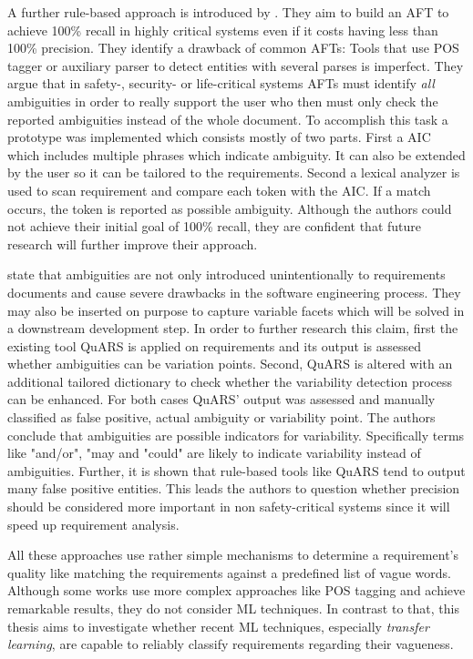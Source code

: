 A further rule-based approach is introduced by \textcite{Tjong:2013}.
They aim to build an \ac{AFT} to achieve 100\% recall in highly critical systems even if it costs having less than 100\% precision.
They identify a drawback of common \acp{AFT}:
Tools that use \ac{POS} tagger or auxiliary parser to detect entities with several parses is imperfect.
They argue that in safety-, security- or life-critical systems \acp{AFT} must identify \textit{all} ambiguities in order to really support the user who then must only check the reported ambiguities instead of the whole document.
To accomplish this task a prototype was implemented which consists mostly of two parts.
First a \ac{AIC} which includes multiple phrases which indicate ambiguity.
It can also be extended by the user so it can be tailored to the requirements.
Second a lexical analyzer is used to scan requirement and compare each token with the \ac{AIC}.
If a match occurs, the token is reported as possible ambiguity.
Although the authors could not achieve their initial goal of 100\% recall, they are confident that future research will further improve their approach.

\textcite{Fantechi:2018} state that ambiguities are not only introduced unintentionally to requirements documents and cause severe drawbacks in the software engineering process.
They may also be inserted on purpose to capture variable facets which will be solved in a downstream development step.
In order to further research this claim, first the existing tool \ac{QuARS} \parencite{Fabbrini:2002} is applied on requirements and its output is assessed whether ambiguities can be variation points.
Second, \ac{QuARS} is altered with an additional tailored dictionary to check whether the variability detection process can be enhanced.
For both cases \ac{QuARS}' output was assessed and manually classified as false positive, actual ambiguity or variability point.
The authors conclude that ambiguities are possible indicators for variability.
Specifically terms like "and/or", "may and "could" are likely to indicate variability instead of ambiguities.
Further, it is shown that rule-based tools like \ac{QuARS} tend to output many false positive entities.
This leads the authors to question whether precision should be considered more important in non safety-critical systems since it will speed up requirement analysis.

All these approaches use rather simple mechanisms to determine a requirement's quality like matching the requirements against a predefined list of vague words.
Although some works use more complex approaches like \ac{POS} tagging and achieve remarkable results, they do not consider \ac{ML} techniques.
In contrast to that, this thesis aims to investigate whether recent \ac{ML} techniques, especially \textit{transfer learning}, are capable to reliably classify requirements regarding their vagueness.
